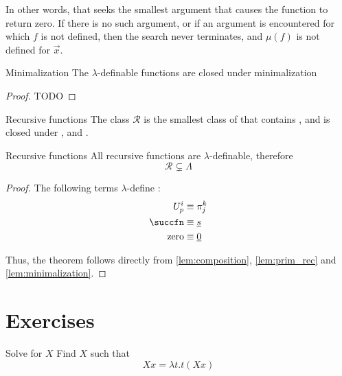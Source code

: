 \documentclass[a4paper, 12pt]{report}
\begin{document}
    In other words, that  seeks the smallest argument that causes the function to return zero. If there is no such argument, or if an argument is encountered for which $f$ is not defined, then the search never terminates, and $\mu(f)$ is not defined for $\vec x$.

    \begin{framedlem}[label={lem:minimalization}]{Minimalization}
        The $\lambda$-definable functions are closed under minimalization
    \end{framedlem}

    \begin{proof}
        TODO
    \end{proof}

    \begin{frameddefn}{Recursive functions}
        The class $\mathcal R$ is the smallest class of  that contains , and is closed under ,  and .
    \end{frameddefn}

    \begin{framedthm}{Recursive functions}
        All recursive functions are $\lambda$-definable, therefore $$\mathcal R \subsetneq \Lambda$$
    \end{framedthm}

    \begin{proof}
        The following terms $\lambda$-define :
        \begin{equation*}
            \begin{split}
                U_p^i &\equiv \pi_j^k \\
                \succfn &\equiv \underline s \\
                \mathrm{zero} &\equiv \underline 0
            \end{split}
        \end{equation*}

        Thus, the theorem follows directly from \cref{lem:composition}, \cref{lem:prim_rec} and \cref{lem:minimalization}.
    \end{proof}

    \section{Exercises}

    \begin{framedprob}{Solve for $X$}
        Find $X$ such that $$Xx = \lambda t.t (Xx)$$
    \end{framedprob}
    
\end{document}
